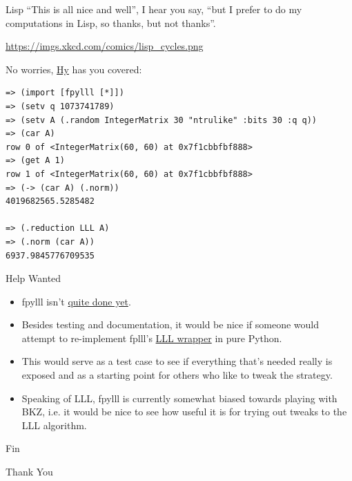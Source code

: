 \documentclass[presentation,smaller]{beamer}
\begin{document}
\begin{frame}[fragile,label={sec:orgheadline31}]{Lisp}
 “This is all nice and well”, I hear you say, “but I prefer to do my computations in Lisp, so thanks, but not thanks”. 

\url{https://imgs.xkcd.com/comics/lisp_cycles.png}

No worries, \href{http://docs.hylang.org/en/latest/}{Hy} has you covered:

\lstset{language=Lisp,label= ,caption= ,captionpos=b,numbers=none}
\begin{lstlisting}
=> (import [fpylll [*]])
=> (setv q 1073741789)
=> (setv A (.random IntegerMatrix 30 "ntrulike" :bits 30 :q q))   
=> (car A)
row 0 of <IntegerMatrix(60, 60) at 0x7f1cbbfbf888>
=> (get A 1)
row 1 of <IntegerMatrix(60, 60) at 0x7f1cbbfbf888>
=> (-> (car A) (.norm))
4019682565.5285482

=> (.reduction LLL A)
=> (.norm (car A))
6937.9845776709535
\end{lstlisting}
\end{frame}

\begin{frame}[label={sec:orgheadline32}]{Help Wanted}
\begin{itemize}
\item \alert{fpylll} isn’t \href{https://github.com/malb/fpylll/issues}{quite done yet}.
\item Besides testing and documentation, it would be nice if someone would attempt to re-implement fplll’s \href{https://github.com/dstehle/fplll/blob/master/src/wrapper.h}{LLL wrapper} in pure Python.
\item This would serve as a test case to see if everything that’s needed really is exposed and as a starting point for others who like to tweak the strategy.
\item Speaking of LLL, \alert{fpylll} is currently somewhat biased towards playing with BKZ, i.e. it would be nice to see how useful it is for trying out tweaks to the LLL algorithm.
\end{itemize}
\end{frame}

\begin{frame}[label={sec:orgheadline33}]{Fin}
\begin{center}
\begin{Huge}
\alert{Thank You}
\end{Huge}
\end{center}
\end{frame}
\end{document}
